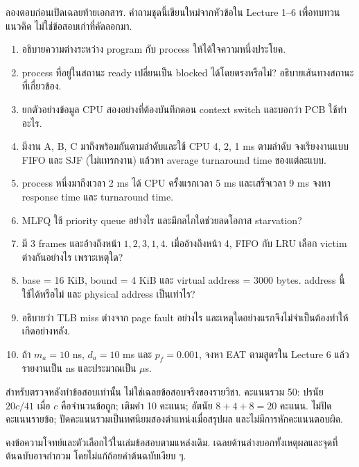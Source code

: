 \noindent ลองตอบก่อนเปิดเฉลยท้ายเอกสาร. คำถามชุดนี้เขียนใหม่จากหัวข้อใน Lecture 1--6 เพื่อทบทวนแนวคิด ไม่ใช่ข้อสอบเก่าที่คัดลอกมา.\par
\begin{enumerate}[leftmargin=1.4em,itemsep=.12cm]
\item อธิบายความต่างระหว่าง program กับ process ให้ได้ใจความหนึ่งประโยค.
\item process ที่อยู่ในสถานะ ready เปลี่ยนเป็น blocked ได้โดยตรงหรือไม่? อธิบายเส้นทางสถานะที่เกี่ยวข้อง.
\item ยกตัวอย่างข้อมูล CPU สองอย่างที่ต้องบันทึกตอน context switch และบอกว่า PCB ใช้ทำอะไร.
\item มีงาน A, B, C มาถึงพร้อมกันตามลำดับและใช้ CPU 4, 2, 1 ms ตามลำดับ จงเรียงงานแบบ FIFO และ SJF (ไม่แทรกงาน) แล้วหา average turnaround time ของแต่ละแบบ.
\item process หนึ่งมาถึงเวลา 2 ms ได้ CPU ครั้งแรกเวลา 5 ms และเสร็จเวลา 9 ms จงหา response time และ turnaround time.
\item MLFQ ใช้ priority queue อย่างไร และมีกลไกใดช่วยลดโอกาส starvation?
\item มี 3 frames และอ้างถึงหน้า $1,2,3,1,4$. เมื่ออ้างถึงหน้า 4, FIFO กับ LRU เลือก victim ต่างกันอย่างไร เพราะเหตุใด?
\item base = 16 KiB, bound = 4 KiB และ virtual address = 3000 bytes. address นี้ใช้ได้หรือไม่ และ physical address เป็นเท่าไร?
\item อธิบายว่า TLB miss ต่างจาก page fault อย่างไร และเหตุใดอย่างแรกจึงไม่จำเป็นต้องทำให้เกิดอย่างหลัง.
\item ถ้า $m_a=10$ ns, $d_a=10$ ms และ $p_f=0.001$, จงหา EAT ตามสูตรใน Lecture 6 แล้วรายงานเป็น ns และประมาณเป็น $\mu$s.
\end{enumerate}
\newpage{}
\noindent สำหรับตรวจหลังทำข้อสอบเท่านั้น ไม่ใช่เฉลยข้อสอบจริงของรายวิชา. คะแนนรวม 50: ปรนัย $20c/41$ เมื่อ $c$ คือจำนวนข้อถูก; เติมคำ 10 คะแนน; อัตนัย $8+4+8=20$ คะแนน. ไม่ปัดคะแนนรายข้อ; ปัดคะแนนรวมเป็นทศนิยมสองตำแหน่งเมื่อสรุปผล และไม่มีการหักคะแนนตอบผิด.\par\medskip
{}
\noindent คงข้อความโจทย์และตัวเลือกไว้ในเล่มข้อสอบตามแหล่งเดิม. เฉลยด้านล่างบอกทั้งเหตุผลและจุดที่ต้นฉบับอาจกำกวม โดยไม่แก้ถ้อยคำต้นฉบับเงียบ ๆ.\par
